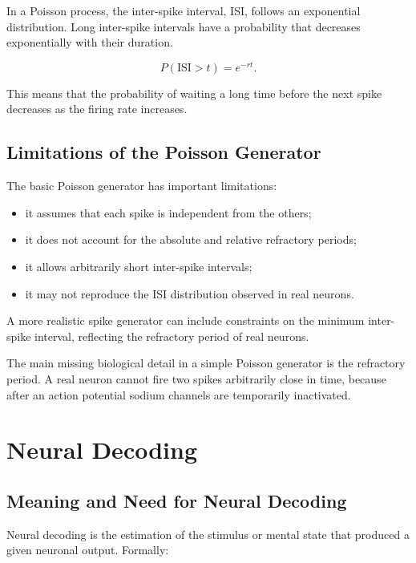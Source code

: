 In a Poisson process, the inter-spike interval, ISI, follows an exponential distribution. Long inter-spike intervals have a probability that decreases exponentially with their duration.

\[
P(\text{ISI} > t)
=
e^{-rt}.
\]

This means that the probability of waiting a long time before the next spike decreases as the firing rate increases.

\subsection{Limitations of the Poisson Generator}

The basic Poisson generator has important limitations:

\begin{itemize}[noitemsep]
    \item it assumes that each spike is independent from the others;
    \item it does not account for the absolute and relative refractory periods;
    \item it allows arbitrarily short inter-spike intervals;
    \item it may not reproduce the ISI distribution observed in real neurons.
\end{itemize}

A more realistic spike generator can include constraints on the minimum inter-spike interval, reflecting the refractory period of real neurons.

\begin{authornote}
The main missing biological detail in a simple Poisson generator is the refractory period. A real neuron cannot fire two spikes arbitrarily close in time, because after an action potential sodium channels are temporarily inactivated.
\end{authornote}

\section{Neural Decoding}

\subsection{Meaning and Need for Neural Decoding}

Neural decoding is the estimation of the stimulus or mental state that produced a given neuronal output. Formally:

